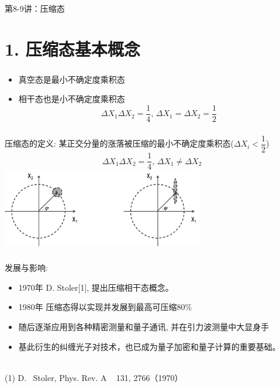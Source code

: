 \begin{frame} [plain]
    \frametitle{}
    \Background[1] 
    \begin{center}
    {\huge 第8-9讲：压缩态}
    \end{center}  
    \addtocounter{framenumber}{-1}   
\end{frame}

\section{1. 压缩态基本概念}

\begin{frame}
    \frametitle{}
    \begin{tcolorbox3}[前情回顾]
     \begin{itemize}
                \item 真空态是最小不确定度乘积态
                \item 相干态也是小不确定度乘积态
                \[ \Delta X_1 \Delta X_2 =\dfrac{1}{4}, \, \Delta X_1 = \Delta X_2 = \frac{1}{2} \] 
         \end{itemize}
    \end{tcolorbox3}
\end{frame}

\begin{frame}
 \frametitle{}
      \begin{center}
           \begin{tcolorbox2}[0.86]{压缩态的定义:}
            某正交分量的涨落被压缩的最小不确定度乘积态($\Delta X_i < \dfrac{1}{2}$)
            \[ \Delta X_1 \Delta X_2 =\dfrac{1}{4}, \, \Delta X_1 \not = \Delta X_2  \] 
            \centering
            \includegraphics[width=0.66\textwidth]{figs/6.png}
          \end{tcolorbox2}  
      \end{center} 
\end{frame}

\begin{frame}
 \frametitle{}
 发展与影响:
 \begin{itemize}
     \item  1970年 D. Stoler[1], 提出压缩相干态概念。
     \item  1980年 压缩态得以实现并发展到最高可压缩80\%
     \item  随后逐渐应用到各种精密测量和量子通讯, 并在引力波测量中大显身手 
     \item 基此衍生的纠缠光子对技术，也已成为量子加密和量子计算的重要基础。
 \end{itemize}
 ~~ \\ {\vspace*{2.8em}}
 (1) D. ~Stoler, Phys. Rev.  A ~ 131, 2766（1970）    
\end{frame}

